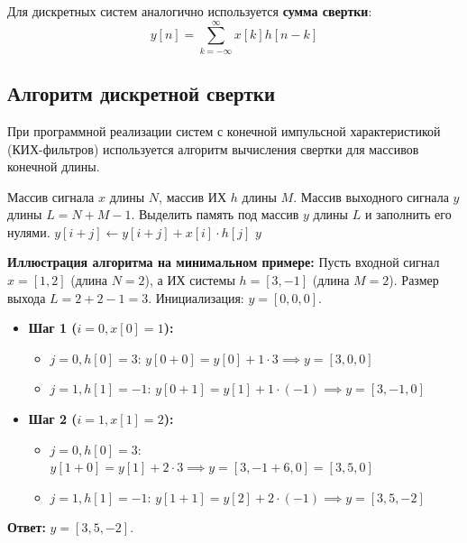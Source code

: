 \documentclass[a4paper, 12pt]{article}
\theoremstyle{definition}
\theoremstyle{plain}
\begin{document}
Для дискретных систем аналогично используется \textbf{сумма свертки}:
$$ y[n] = \sum_{k=-\infty}^{\infty} x[k] h[n - k] $$

\subsection{Алгоритм дискретной свертки}

При программной реализации систем с конечной импульсной характеристикой (КИХ-фильтров) используется алгоритм вычисления свертки для массивов конечной длины.

\begin{algorithm}[H]
\caption{Вычисление дискретной свертки двух конечных сигналов}
\begin{algorithmic}[1]
\Require Массив сигнала $x$ длины $N$, массив ИХ $h$ длины $M$.
\Ensure Массив выходного сигнала $y$ длины $L = N+M-1$.
\State Выделить память под массив $y$ длины $L$ и заполнить его нулями.
        \State $y[i+j] \gets y[i+j] + x[i] \cdot h[j]$
    \EndFor
\EndFor
\State \Return $y$
\end{algorithmic}
\end{algorithm}

\textbf{Иллюстрация алгоритма на минимальном примере:}
Пусть входной сигнал $x = [1, 2]$ (длина $N=2$), а ИХ системы $h = [3, -1]$ (длина $M=2$).
Размер выхода $L = 2 + 2 - 1 = 3$. Инициализация: $y = [0, 0, 0]$.
\begin{itemize}
    \item \textbf{Шаг 1 ($i=0, x[0]=1$):}
    \begin{itemize}
        \item $j=0, h[0]=3$: $y[0+0] = y[0] + 1 \cdot 3 \implies y = [3, 0, 0]$
        \item $j=1, h[1]=-1$: $y[0+1] = y[1] + 1 \cdot (-1) \implies y = [3, -1, 0]$
    \end{itemize}
    \item \textbf{Шаг 2 ($i=1, x[1]=2$):}
    \begin{itemize}
        \item $j=0, h[0]=3$: $y[1+0] = y[1] + 2 \cdot 3 \implies y = [3, -1+6, 0] = [3, 5, 0]$
        \item $j=1, h[1]=-1$: $y[1+1] = y[2] + 2 \cdot (-1) \implies y = [3, 5, -2]$
    \end{itemize}
\end{itemize}
\textbf{Ответ:} $y = [3, 5, -2]$.
\end{document}
